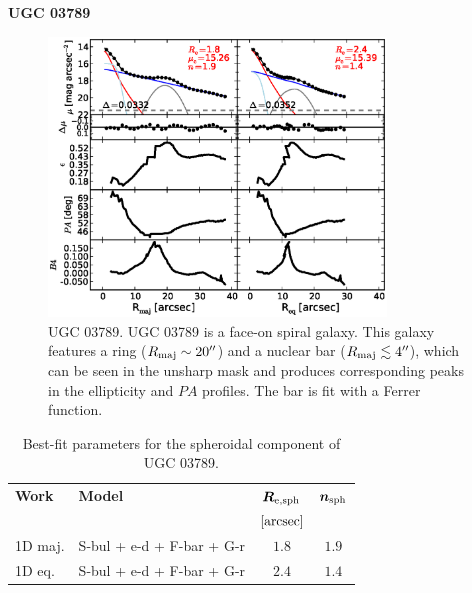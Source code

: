 \documentclass[preprint2]{emulateapj}
\newcommand{\fitfigurewidth}{0.8\textwidth}
\begin{document}
  \clearpage\newpage\noindent
  {\bf UGC 03789 \\}

  \begin{figure}[h]
  \begin{center}
  \includegraphics[width=\fitfigurewidth]{images/ugc03789_1Dfit.eps}
  \caption{UGC 03789.
  UGC 03789 is a face-on spiral galaxy.
  This galaxy features a ring ($R_{\rm maj} \sim 20''$) and a nuclear bar ($R_{\rm maj} \lesssim 4''$),
  which can be seen in the unsharp mask and produces corresponding peaks in the ellipticity and $PA$ profiles.
  The bar is fit with a Ferrer function.
  }
  \end{center}
  \end{figure}

  \begin{table}[h]
  \small
  \caption{Best-fit parameters for the spheroidal component of UGC 03789.}
  \begin{center}
  \begin{tabular}{llcc}
  \hline
  {\bf Work} & {\bf Model}   & $\bm R_{\rm e,sph}$    & $\bm n_{\rm sph}$ \\
    &  &  $[\rm arcsec]$ & \\
  \hline
  1D maj. & S-bul + e-d + F-bar + G-r & $1.8$  &  $1.9$ \\
  1D eq.  & S-bul + e-d + F-bar + G-r & $2.4$  &  $1.4$ \\
  \hline
  \end{tabular}
  \end{center}
  \label{tab:ugc3789}
  \end{table}
\end{document}

